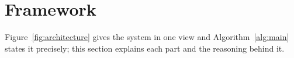 \documentclass[a4paper,fleqn]{cas-dc}
\begin{document}
\section{Framework}\label{sec:framework}

Figure~\ref{fig:architecture} gives the system in one view and
Algorithm~\ref{alg:main} states it precisely; this section explains each part
and the reasoning behind it.

\end{document}

